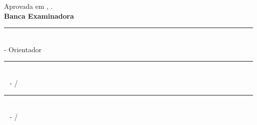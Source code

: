 \begin{folhadeaprovacao}
			\begin{flushleft}%
			    {Aprovada em {\imprimirmesapresentacao, \imprimiranoapresentacao}.}\\
		 		\textbf{Banca Examinadora}\\ %
			\end{flushleft}

				\vspace*{0.3 cm}%

			\begin{center}	

				\vspace*{0.5 cm}%
				\rule{12 cm}{.1 mm}\\
				{\imprimirtitulacaoorientador}{ }{\imprimirorientador} - Orientador\\
				
				\vspace*{2 cm}%
				\rule{12 cm}{.1 mm}\\
				{\imprimirtitulacaoexamum\ \imprimirnmexamum} - {\imprimirinstexamum /\imprimirdepartamentoexamum}
			
				\vspace*{1.5 cm}%
				\rule{12 cm}{.1 mm}\\
				{\imprimirtitulacaoexamdois\ \imprimirnomeexamdois} - {\imprimirinstexamdois /\imprimirdepartamentoexamdois}
				
				\vspace*{1 cm}%
						
				\vspace*{1.3 cm}%
		    \end{center}%


\end{folhadeaprovacao}
\makeatother
